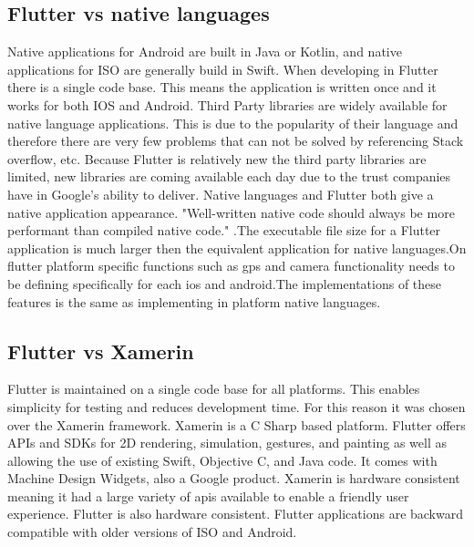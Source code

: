 \subsection{Flutter vs native languages}
Native applications for Android are built in Java or Kotlin, and native applications for ISO are generally build in Swift. When developing in Flutter there is a single code base. This means the application is written once and it works for both IOS and Android. Third Party libraries are widely available for native language applications. This is due to the popularity of their language and therefore there are very few problems that can not be solved by referencing Stack overflow, etc. Because Flutter is relatively new the third party libraries are limited, new libraries are coming available each day due to the trust companies have in Google’s ability to deliver. Native languages and Flutter both give a native application appearance. "Well-written native code should always be more performant than compiled native code." \cite{FlutterVS_2018}.The executable file size for a Flutter application is much larger then the equivalent application for native languages.On flutter platform specific functions such as gps and camera functionality needs to be defining specifically for each ios and android.The implementations of these features is the same as implementing in platform native languages.\cite{flutter_application}

\subsection{Flutter vs Xamerin}
Flutter is maintained on a single code base for all platforms. This enables simplicity for testing and reduces development time. For this reason it was chosen over the Xamerin framework. Xamerin is a C Sharp based platform. Flutter offers APIs and SDKs for 2D rendering, simulation, gestures, and painting as well as allowing the use of existing Swift, Objective C, and Java code. It comes with Machine Design Widgets, also a Google product. \cite{flutterVsXamarin}Xamerin is hardware consistent meaning it had a large variety of apis available to enable a friendly user experience. Flutter is also hardware consistent. Flutter applications are backward compatible with older versions of ISO and Android.\cite{flutterVsReactVsXamarin}

